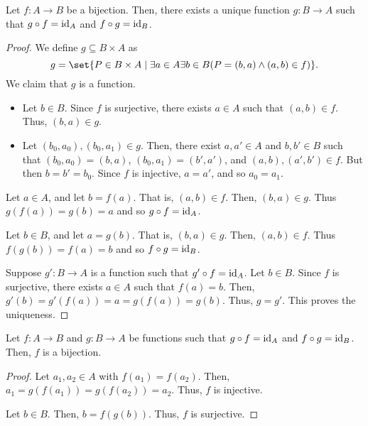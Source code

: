 \begin{proposition}[Inverse] \label{thm:bijections:inverse}
    Let $f : A \to B$ be a bijection.
    Then, there exists a unique function $g : B \to A$ such that
    $g \circ f = \mathrm{id}_{A}$ and $f \circ g = \mathrm{id}_{B}$.
\end{proposition}
\begin{proof}
    We define $g \subseteq B \times A$ as \[
        g = \set{P \in B \times A \mid \exists a \in A \exists b \in B
            (P = (b, a) \land (a, b) \in f)
        }.
    \] We claim that $g$ is a function.
    \begin{itemize}
        \item Let $b \in B$.
            Since $f$ is surjective, there exists $a \in A$ such that
            $(a, b) \in f$.
            Thus, $(b, a) \in g$.
        \item Let $(b_{0}, a_{0}), (b_{0}, a_{1}) \in g$.
            Then, there exist $a, a' \in A$ and $b, b' \in B$ such that
            $(b_{0}, a_{0}) = (b, a)$, $(b_{0}, a_{1}) = (b', a')$,
            and $(a, b), (a', b') \in f$.
            But then $b = b' = b_{0}$.
            Since $f$ is injective, $a = a'$, and so $a_{0} = a_{1}$.
    \end{itemize}

    Let $a \in A$, and let $b = f(a)$.
    That is, $(a, b) \in f$.
    Then, $(b, a) \in g$.
    Thus $g(f(a)) = g(b) = a$ and so $g \circ f = \mathrm{id}_{A}$.

    Let $b \in B$, and let $a = g(b)$.
    That is, $(b, a) \in g$.
    Then, $(a, b) \in f$.
    Thus $f(g(b)) = f(a) = b$ and so $f \circ g = \mathrm{id}_{B}$.

    Suppose $g' : B \to A$ is a function such that $g' \circ f = \mathrm{id}_{A}$.
    Let $b \in B$.
    Since $f$ is surjective, there exists $a \in A$ such that $f(a) = b$.
    Then, $g'(b) = g'(f(a)) = a = g(f(a)) = g(b)$.
    Thus, $g = g'$.
    This proves the uniqueness.
\end{proof}
\begin{theorem} \label{thm:bijections:construction}
    Let $f : A \to B$ and $g : B \to A$ be functions such that
    $g \circ f = \mathrm{id}_{A}$ and $f \circ g = \mathrm{id}_{B}$.
    Then, $f$ is a bijection.
\end{theorem}
\begin{proof}
    Let $a_{1}, a_{2} \in A$ with $f(a_{1}) = f(a_{2})$.
    Then, $a_{1} = g(f(a_{1})) = g(f(a_{2})) = a_{2}$.
    Thus, $f$ is injective.

    Let $b \in B$.
    Then, $b = f(g(b))$.
    Thus, $f$ is surjective.
\end{proof}

